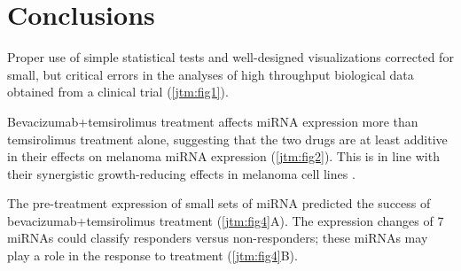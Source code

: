 \section{Conclusions}

Proper use of simple statistical tests and well-designed visualizations corrected for
small, but critical errors in the analyses of high throughput biological data
obtained from a clinical trial (\autoref{jtm:fig1}).

Bevacizumab+temsirolimus treatment affects miRNA expression more than temsirolimus treatment alone,
suggesting that the two drugs are at least additive in their effects on melanoma miRNA expression (\autoref{jtm:fig2}).
This is in line with their synergistic growth-reducing effects in melanoma cell lines \cite{Molhoek:2008jx}.

The pre-treatment expression of small sets of miRNA
predicted the success of bevacizumab+temsirolimus treatment (\autoref{jtm:fig4}A). 
The expression changes of 7 miRNAs could classify responders versus non-responders; these
miRNAs may play a role in the response to treatment (\autoref{jtm:fig4}B).





